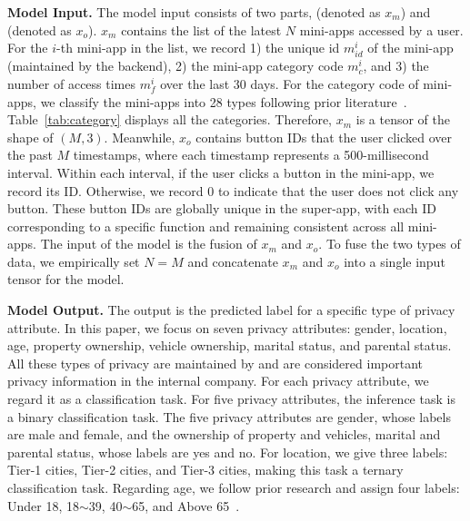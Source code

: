 \noindent \textbf{Model Input.}
The model input consists of two parts, \mini (denoted as $x_m$) and \op
(denoted as $x_o$). $x_m$ contains the list of the latest $N$ mini-apps accessed
by a user. For the $i$-th mini-app in the list, we record 1) the unique id
$m^{i}_{id}$ of the mini-app (maintained by the \alipay backend), 2) the
mini-app category code $m^i_{c}$, and 3) the number of access times $m^i_{f}$
over the last 30 days. For the category code of mini-apps, we classify the
mini-apps into 28 types following prior literature~\cite{li2022collect}. Table~\ref{tab:category} displays all the categories. Therefore, $x_m$ is a tensor
of the shape of $(M, 3)$. 
Meanwhile, $x_o$ contains button IDs that the user clicked over the past $M$ timestamps, where each timestamp represents a 500-millisecond interval. 
Within each interval, if the
user clicks a button in the mini-app, we record its ID. Otherwise,
we record $0$ to indicate that the user does not click any button. These button IDs are globally unique in the super-app, with each ID corresponding to a specific function and remaining consistent across all mini-apps. The input of the model is the fusion of
$x_m$ and $x_o$. To fuse the two types of data, we empirically set $N=M$ and
concatenate $x_m$ and $x_o$ into a single input tensor for the model.



\noindent \textbf{Model Output.}
The output is the predicted label for a specific type of privacy attribute. In this
paper, we focus on seven privacy attributes: gender, location, age, property
ownership, vehicle ownership, marital status, and parental status. All these
types of privacy are maintained by \alipay and are considered important privacy
information in the internal company. For each privacy attribute, we regard it
as a classification task. For five privacy attributes, the inference task is a
binary classification task. The five privacy attributes are gender, whose labels are
male and female, and the ownership of property and vehicles, marital and
parental status, whose labels are yes and no. For location, we give three
labels: Tier-1 cities, Tier-2 cities, and Tier-3 cities, making this task a ternary
classification task.  Regarding age, we follow prior research and assign four labels:
Under 18, 18$\sim$39, 40$\sim$65, and Above 65~\cite{shauly2020public}.




